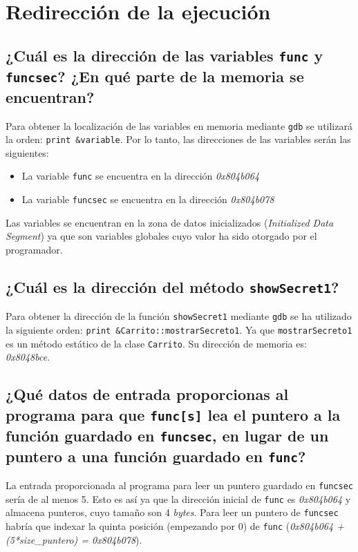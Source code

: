 \documentclass[10pt,a4paper]{article}
\begin{document}
\section{Redirección de la ejecución}

\subsection{¿Cuál es la dirección de las variables \texttt{func} y \texttt{funcsec}? ¿En qué parte de la memoria se encuentran?}

Para obtener la localización de las variables en memoria mediante \texttt{gdb} se utilizará la orden: \texttt{print \&{}variable}. Por lo tanto, las direcciones de las variables serán las siguientes:
\begin{itemize}
\item La variable \texttt{func} se encuentra en la dirección \emph{0x804b064}
\item La variable \texttt{funcsec} se encuentra en la dirección \emph{0x804b078}
\end{itemize}

Las variables se encuentran en la zona de datos inicializados (\emph{Initialized Data Segment}) ya que son variables globales cuyo valor ha sido otorgado por el programador.


\subsection{¿Cuál es la dirección del método \texttt{showSecret1}?}

Para obtener la dirección de la función \texttt{showSecret1} mediante \texttt{gdb} se ha utilizado la siguiente orden: \texttt{print \&{}Carrito::mostrarSecreto1}. Ya que \texttt{mostrarSecreto1} es un método estático de la clase \texttt{Carrito}. Su dirección de memoria es: \emph{0x8048bce}.


\subsection{¿Qué datos de entrada proporcionas al programa para que \texttt{func[s]} lea el puntero a la función guardado en \texttt{funcsec}, en lugar de un puntero a una función guardado en \texttt{func}?}

La entrada proporcionada al programa para leer un puntero guardado en \texttt{funcsec} sería de al menos 5. Esto es así ya que la dirección inicial de \texttt{func} es \emph{0x804b064} y almacena punteros, cuyo tamaño son 4 \emph{bytes}. Para leer un puntero de \texttt{funcsec} habría que indexar la quinta posición (empezando por 0) de \texttt{func} (\emph{0x804b064 + (5*size\_{}puntero) = 0x804b078}).
\end{document}
